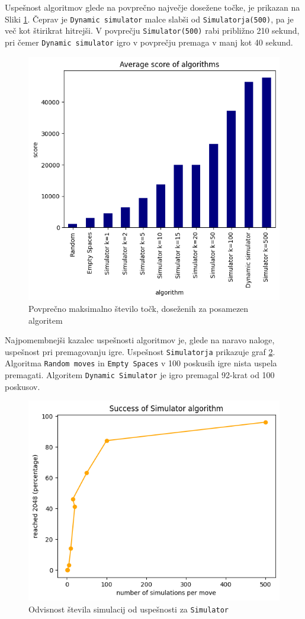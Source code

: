 \documentclass{article}
\begin{document}
Uspešnost algoritmov glede na povprečno največje dosežene točke, je prikazan na Sliki \ref{score}. Čeprav je \texttt{Dynamic simulator} malce slabši od \texttt{Simulatorja(500)}, pa je več kot štirikrat hitrejši. V povprečju \texttt{Simulator(500)} rabi približno 210 sekund, pri čemer \texttt{Dynamic simulator} igro v povprečju premaga v manj kot 40 sekund.

\begin{figure}[ht!]
\centering
\includegraphics[width=12cm]{score.png}
\caption{Povprečno maksimalno število točk, doseženih za posamezen algoritem}
\label{score}
\end{figure}

Najpomembnejši kazalec uspešnosti algoritmov je, glede na naravo naloge, uspešnost pri premagovanju igre. Uspešnost \texttt{Simulatorja} prikazuje graf \ref{performance}. Algoritma \texttt{Random moves} in \texttt{Empty Spaces} v 100 poskusih igre nista uspela premagati. Algoritem \texttt{Dynamic Simulator} je igro premagal 92-krat od 100 poskusov.

\begin{figure}[ht!]
\centering
\includegraphics[width=12cm]{simulator.png}
\caption{Odvisnost števila simulacij od uspešnosti za \texttt{Simulator}}
\label{performance}
\end{figure}
\end{document}
